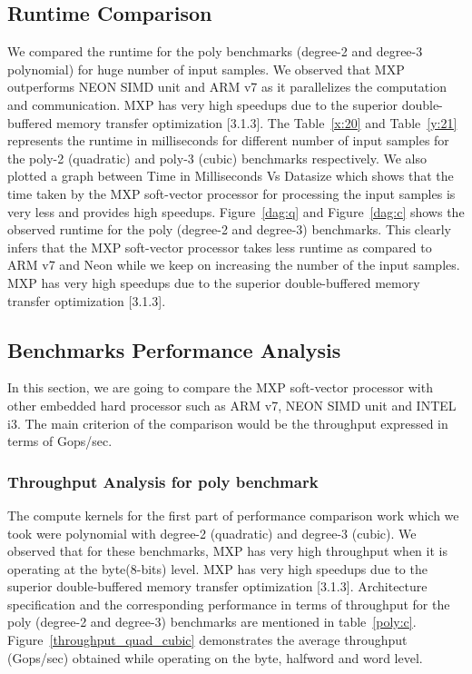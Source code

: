 \subsection{Runtime Comparison}
We compared the runtime for the poly benchmarks (degree-2 and degree-3 polynomial) for huge number of input samples. We observed that MXP outperforms NEON SIMD unit and ARM v7 as it parallelizes the computation and communication. MXP has very high speedups due to the superior double-buffered memory transfer optimization [3.1.3]. The Table~\ref{x:20} and Table~\ref{y:21} represents the runtime in milliseconds for different number of input samples for the poly-2 (quadratic) and poly-3 (cubic) benchmarks respectively. We also plotted a graph between Time in Milliseconds Vs Datasize which shows that the time taken by the MXP soft-vector processor for processing the input samples is very less and provides high speedups. Figure~\ref{dag:q} and Figure~\ref{dag:c} shows the observed runtime for the poly (degree-2 and degree-3) benchmarks. This clearly infers that the MXP soft-vector processor takes less runtime as compared to ARM v7 and Neon while we keep on increasing the number of the input samples. MXP has very high speedups due to the superior double-buffered memory transfer optimization [3.1.3].












\subsection{Benchmarks Performance Analysis}
In this section, we are going to compare the MXP soft-vector processor with other embedded hard processor such as ARM v7, NEON SIMD unit and INTEL i3. The main criterion of the comparison would be the throughput expressed in terms of Gops/sec.

\subsubsection{Throughput Analysis for poly benchmark}

The compute kernels for the first part of performance comparison work which we took were polynomial with degree-2 (quadratic) and degree-3 (cubic).
We observed that for these benchmarks, MXP has very high throughput when it is operating at the byte(8-bits) level. MXP has very high speedups due to the superior double-buffered memory transfer optimization [3.1.3]. Architecture specification and the corresponding performance in terms of throughput for the poly (degree-2 and degree-3) benchmarks are mentioned in table~\ref{poly:c}.  Figure~\ref{throughput_quad_cubic} demonstrates the average throughput (Gops/sec) obtained while operating on the byte, halfword and word level.

